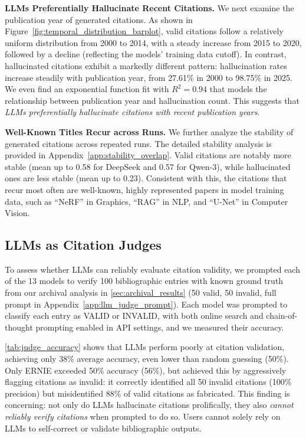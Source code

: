 \noindent
\textbf{LLMs Preferentially Hallucinate Recent Citations.}
We next examine the publication year of generated citations. As shown in Figure~\ref{fig:temporal_distribution_barplot}, valid citations follow a relatively uniform distribution from 2000 to 2014, with a steady increase from 2015 to 2020, followed by a decline (reflecting the models' training data cutoff). In contrast, hallucinated citations exhibit a markedly different pattern: hallucination rates increase steadily with publication year, from 27.61\% in 2000 to 98.75\% in 2025. We even find an exponential function fit with $R^2=0.94$ that models the relationship between publication year and hallucination count. This suggests that \textit{LLMs preferentially hallucinate citations with recent publication years}.



\noindent
\textbf{Well-Known Titles Recur across Runs.}
We further analyze the stability of generated citations across repeated runs. 
The detailed stability analysis is provided in Appendix~\ref{app:stability_overlap}.
Valid citations are notably more stable (mean up to 0.58 for DeepSeek and 0.57 for Qwen-3), while hallucinated ones are less stable (mean up to 0.23).
Consistent with this, the citations that recur most often are well-known, highly represented papers in model training data, such as ``NeRF'' in Graphics, ``RAG'' in NLP, and ``U-Net'' in Computer Vision.


\subsection{LLMs as Citation Judges}
\label{subsec:llm_as_judge}


To assess whether LLMs can reliably evaluate citation validity, we prompted each of the 13 models to verify 100 bibliographic entries with known ground truth from our archival analysis in \cref{sec:archival_results} (50 valid, 50 invalid, full prompt in Appendix~\ref{app:llm_judge_prompt}).
Each model was prompted to classify each entry as VALID or INVALID, with both online search and chain-of-thought prompting enabled in API settings, and we measured their accuracy.

\cref{tab:judge_accuracy} shows that LLMs perform poorly at citation validation, achieving only 38\% average accuracy, even lower than random guessing (50\%).
Only ERNIE exceeded 50\% accuracy (56\%), but achieved this by aggressively flagging citations as invalid: it correctly identified all 50 invalid citations (100\% precision) but misidentified 88\% of valid citations as fabricated.
This finding is concerning: not only do LLMs hallucinate citations prolifically, they also \textit{cannot reliably verify citations} when prompted to do so. Users cannot solely rely on LLMs to self-correct or validate bibliographic outputs.

